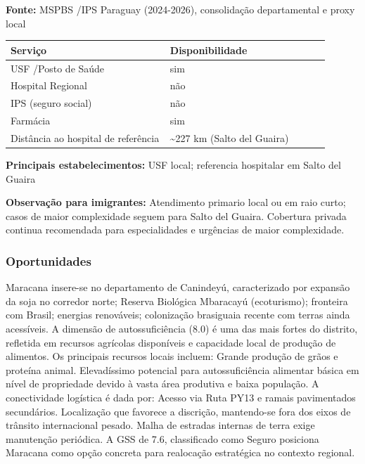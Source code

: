 \textbf{Fonte:} MSPBS /\allowbreak  IPS Paraguay (2024-2026), consolidação
departamental e proxy local

{\def\LTcaptype{none} %
\begin{longtable}{@{}>{\raggedright\arraybackslash}p{0.45\linewidth} >{\raggedright\arraybackslash}p{0.45\linewidth}@{}}
\toprule\noalign{}
Serviço & Disponibilidade \\
\midrule\noalign{}
\endhead
\bottomrule\noalign{}
\endlastfoot
USF /\allowbreak  Posto de Saúde & sim \\
Hospital Regional & não \\
IPS (seguro social) & não \\
Farmácia & sim \\
Distância ao hospital de referência & \textasciitilde227 km (Salto del
Guaira) \\
\end{longtable}
}

\textbf{Principais estabelecimentos:} USF local; referencia hospitalar
em Salto del Guaira

\textbf{Observação para imigrantes:} Atendimento primario local ou em
raio curto; casos de maior complexidade seguem para Salto del Guaira.
Cobertura privada continua recomendada para especialidades e urgências
de maior complexidade.
\newpage

\subsubsection*{Oportunidades}\label{oport-maracana-1414}
Maracana insere-se no departamento de Canindeyú, caracterizado por expansão da soja no corredor norte; Reserva Biológica Mbaracayú (ecoturismo); fronteira com Brasil; energias renováveis; colonização brasiguaia recente com terras ainda acessíveis. A dimensão de autossuficiência (8.0) é uma das mais fortes do distrito, refletida em recursos agrícolas disponíveis e capacidade local de produção de alimentos. Os principais recursos locais incluem: Grande produção de grãos e proteína animal. Elevadíssimo potencial para autossuficiência alimentar básica em nível de propriedade devido à vasta área produtiva e baixa população. A conectividade logística é dada por: Acesso via Ruta PY13 e ramais pavimentados secundários. Localização que favorece a discrição, mantendo-se fora dos eixos de trânsito internacional pesado. Malha de estradas internas de terra exige manutenção periódica. A GSS de 7.6, classificado como Seguro posiciona Maracana como opção concreta para realocação estratégica no contexto regional.

